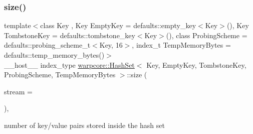 \subsubsection{\texorpdfstring{size()}{size()}}
{\footnotesize\ttfamily template$<$class Key , Key Empty\+Key = defaults\+::empty\+\_\+key$<$\+Key$>$(), Key Tombstone\+Key = defaults\+::tombstone\+\_\+key$<$\+Key$>$(), class Probing\+Scheme  = defaults\+::probing\+\_\+scheme\+\_\+t$<$\+Key, 16$>$, index\+\_\+t Temp\+Memory\+Bytes = defaults\+::temp\+\_\+memory\+\_\+bytes()$>$ \\
\+\_\+\+\_\+host\+\_\+\+\_\+ index\+\_\+type \hyperlink{classwarpcore_1_1HashSet}{warpcore\+::\+Hash\+Set}$<$ Key, Empty\+Key, Tombstone\+Key, Probing\+Scheme, Temp\+Memory\+Bytes $>$\+::size (\begin{DoxyParamCaption}\item[{cuda\+Stream\+\_\+t}]{stream = {} }\end{DoxyParamCaption})\hspace{0.3cm}{\ttfamily [inline]}, {\ttfamily [noexcept]}}



number of key/value pairs stored inside the hash set 

